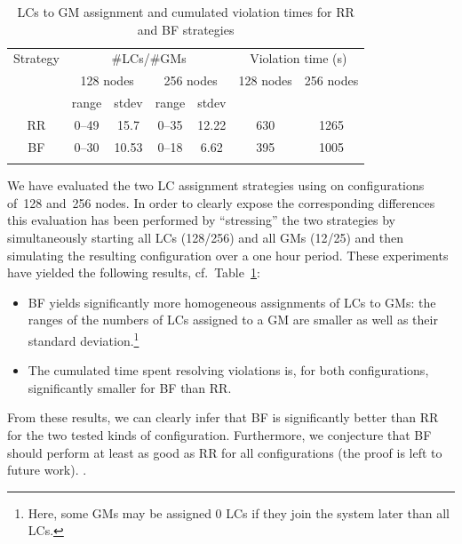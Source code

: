 
\begin{table}[ht]
\begin{center}
    \begin{tabular}{|c|||c|c||c|c|||c|c|}
        \thickhline
        Strategy 
          & \multicolumn{4}{c}{\#LCs/\#GMs}
          & \multicolumn{2}{c}{Violation time (s)} \\
          & \multicolumn{2}{c}{128 nodes}  & \multicolumn{2}{c}{256 nodes}
          & 128 nodes & 256 nodes \\
          & range & stdev & range & stdev & &  \\
        \thickhline
        RR & 0--49 & 15.7  & 0--35 & 12.22 & 630 & 1265 \\ \hline
        BF & 0--30 & 10.53 & 0--18 & 6.62  & 395 & 1005 \\
        \thickhline
    \end{tabular}
    \caption{LCs to GM assignment and cumulated violation times for RR
      and BF strategies}
\end{center}
\label{tbl:assignmenResults}
\end{table}


We have evaluated the two LC assignment strategies using \vmps on
configurations of~128 and~256 nodes. In order to clearly expose the
corresponding differences this evaluation has been performed by
``stressing'' the two strategies by simultaneously
starting all LCs (128/256) and all GMs (12/25) and then simulating the
resulting configuration over a one hour period.  These experiments
have yielded the following results, cf.\ Table~\ref{tbl:assignmenResults}:
\begin{itemize}
  \item BF yields significantly more homogeneous assignments of LCs to
    GMs: the ranges of the numbers of LCs assigned to a GM are smaller
    as well as their standard deviation.\footnote{Here, some GMs may
      be assigned 0 LCs if they join the system later than all LCs.}
  \item The cumulated time spent resolving violations is, for both
    configurations, significantly smaller for BF than RR.
\end{itemize}
From these results, we can clearly infer that BF is significantly
better than RR for the two tested kinds of configuration. Furthermore,
we conjecture that BF should perform at least as good as RR for all
configurations (the proof is left to future work).
.



